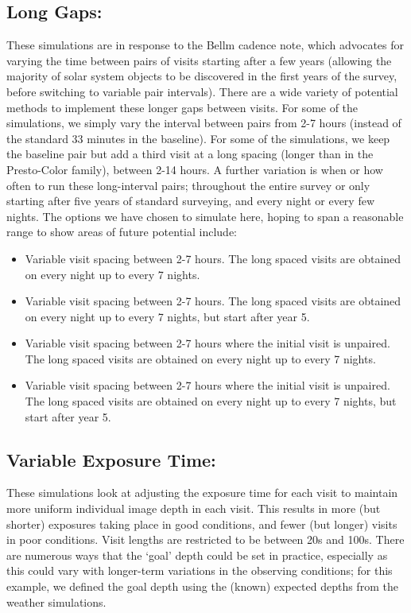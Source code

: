 \subsection{Long Gaps:}
These simulations are in response to the Bellm cadence note, which advocates for varying the time between pairs of visits starting after a few years (allowing the majority of solar system objects to be discovered in the first years of the survey, before switching to variable pair intervals). There are a wide variety of potential methods to implement these longer gaps between visits. For some of the simulations, we simply vary the interval between pairs from 2-7 hours (instead of the standard 33 minutes in the baseline). For some of the simulations, we keep the baseline pair but add a third visit at a long spacing (longer than in the Presto-Color family), between 2-14 hours.  A further variation is when or how often to run these long-interval pairs; throughout the entire survey or only starting after five years of standard surveying, and every night or every few nights. The options we have chosen to simulate here, hoping to span a reasonable range to show areas of future potential include:
\begin{itemize}
\item Variable visit spacing between 2-7 hours. The long spaced visits are obtained on every night up to every 7 nights.
\item Variable visit spacing between 2-7 hours. The long spaced visits are obtained on every night up to every 7 nights, but start after year 5.
\item Variable visit spacing between 2-7 hours where the initial visit is unpaired. The long spaced visits are obtained on every night up to every 7 nights. 
\item Variable visit spacing between 2-7 hours where the initial visit is unpaired. The long spaced visits are obtained on every night up to every 7 nights, but start after year 5.
\end{itemize}

\subsection{Variable Exposure Time:}
These simulations look at adjusting the exposure time for each visit to maintain more uniform individual image depth in each visit. This results in more (but shorter) exposures taking place in good conditions, and fewer (but longer) visits in poor conditions. Visit lengths are restricted to be between 20s and 100s. There are numerous ways that the `goal' depth could be set in practice, especially as this could vary with longer-term variations in the observing conditions; for this example, we defined the goal depth using the (known) expected depths from the weather simulations.

